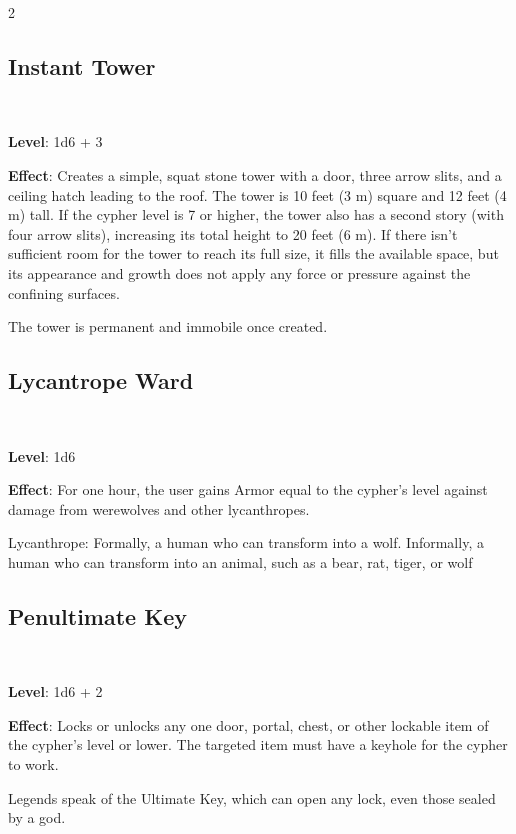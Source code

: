 \begin{multicols}{2}
\subsection{Instant Tower}

\textbf{Level}: 1d6 + 3 

\textbf{Effect}: Creates a simple, squat stone tower with a door, three arrow slits, and a ceiling hatch leading to the roof. The tower is 10 feet (3 m) square and 12 feet (4 m) tall. If the cypher level is 7 or higher, the tower also has a second story (with four arrow slits), increasing its total height to 20 feet (6 m). If there isn’t sufficient room for the tower to reach its full size, it fills the available space, but its appearance and growth does not apply any force or pressure against the confining surfaces. 

The tower is permanent and immobile once created. 

\subsection{Lycantrope Ward}

\textbf{Level}: 1d6 

\textbf{Effect}: For one hour, the user gains Armor equal to the cypher’s level against damage from werewolves and other lycanthropes. 

Lycanthrope: Formally, a human who can transform into a wolf. Informally, a human who can transform into an animal, such as a bear, rat, tiger, or wolf

\subsection{Penultimate Key}

\textbf{Level}: 1d6 + 2 

\textbf{Effect}: Locks or unlocks any one door, portal, chest, or other lockable item of the cypher’s level or lower. The targeted item must have a keyhole for the cypher to work. 

Legends speak of the Ultimate Key, which can open any lock, even those sealed by a god.


\end{multicols}
